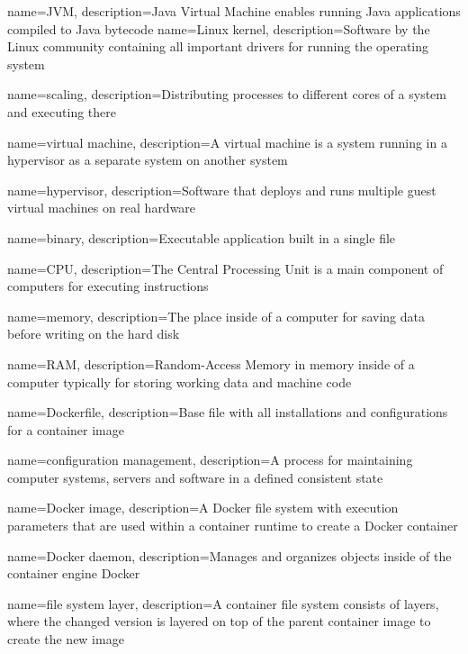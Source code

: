 {
    name={JVM},
    description={Java Virtual Machine enables running Java applications compiled to Java bytecode}
}
{
    name={Linux kernel},
    description={Software by the Linux community containing all important drivers for running the operating system}
}

{
    name={scaling},
    description={Distributing processes to different cores of a system and executing there}
}

{
    name={virtual machine},
    description={A virtual machine is a system running in a hypervisor as a separate system on another system}
}

{
    name={hypervisor},
    description={Software that deploys and runs multiple guest virtual machines on real hardware}
}


{
    name={binary},
    description={Executable application built in a single file}
}

{
    name={CPU},
    description={The Central Processing Unit is a main component of computers for executing instructions}
}

{
    name={memory},
    description={The place inside of a computer for saving data before writing on the hard disk}
}

{
    name={RAM},
    description={Random-Access Memory in memory inside of a computer typically for storing working data and machine code}
}

{
    name={Dockerfile},
    description={Base file with all installations and configurations for a container image}
}

{
    name={configuration management},
    description={A process for maintaining computer systems, servers and software in a defined consistent state}
}

{
    name={Docker image},
    description={A Docker file system with execution parameters that are used within a container runtime to create a Docker container}
}

{
    name={Docker daemon},
    description={Manages and organizes objects inside of the container engine Docker}
}

{
    name={file system layer},
    description={A container file system consists of layers, where the changed version is layered on top of the parent container image to create the new image}
}

